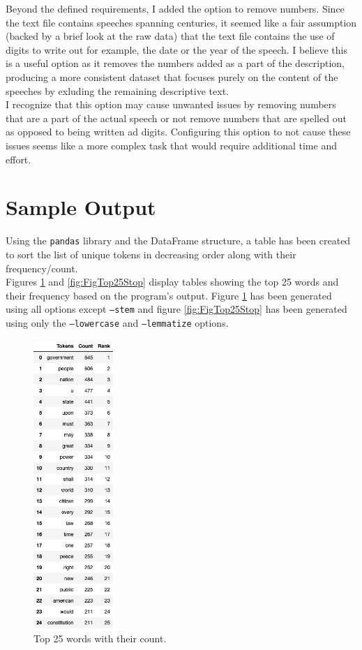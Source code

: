 \documentclass[titlepage]{article}
\begin{document}
Beyond the defined requirements, I added the option to remove numbers. Since the text file
contains speeches spanning centuries, it seemed like a fair assumption (backed by a brief look
at the raw data) that the text file contains the use of digits to write out for example, the date
or the year of the speech. I believe this is a useful option as it removes the numbers added as a 
part of the description, producing a more consistent dataset that focuses purely on the content of 
the speeches by exluding the remaining descriptive text.\\

I recognize that this option may cause unwanted issues by removing numbers that are a part of the 
actual speech or not remove numbers that are spelled out as opposed to being written ad digits.
Configuring this option to not cause these issues seems like a more complex task that would require
additional time and effort.

\section{Sample Output}
Using the \texttt{pandas} library and the DataFrame structure, a table has been created to sort 
the list of unique tokens in decreasing order along with their frequency/count.\\

Figures \ref{fig:FigTop25} and \ref{fig:FigTop25Stop} display tables showing the top 25 words and
their frequency based on the program's output. Figure \ref{fig:FigTop25} has been generated using 
all options except \texttt{--stem} and figure \ref{fig:FigTop25Stop} has been generated using only 
the \texttt{--lowercase} and \texttt{--lemmatize} options.

\begin{figure}[H]
    \centering
    \includegraphics[width=0.27\textwidth]{figures/df_top25.png}
    \caption{Top 25 words with their count.}
    \label{fig:FigTop25}
\end{figure}
\end{document}
